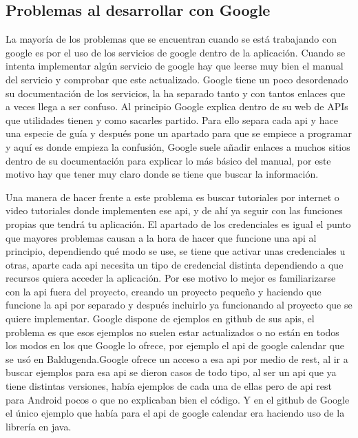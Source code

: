 \subsection{Problemas al desarrollar con Google}
\label{subsecc:Problemas al desarrollar con Google}

La mayoría de los problemas que se encuentran cuando se está trabajando con google es por el uso de los servicios de google dentro de la aplicación.
Cuando se intenta implementar algún servicio de google hay que leerse muy bien el manual del servicio y comprobar que este actualizado. Google tiene un poco desordenado su documentación de los servicios, la ha separado tanto y con tantos enlaces que a veces llega a ser confuso.
Al principio Google explica dentro de su web de APIs que utilidades tienen y como sacarles partido. Para ello separa cada api y hace una especie de guía y después pone un apartado para que se empiece a programar y aquí es donde empieza la confusión, Google suele añadir enlaces a muchos sitios dentro de su documentación para explicar lo más básico del manual, por este motivo hay que tener muy claro donde se tiene que buscar la información.

Una manera de hacer frente a este problema es buscar tutoriales por internet o video tutoriales donde implementen ese api, y de ahí ya seguir con las funciones propias que tendrá tu aplicación.
El apartado de los credenciales es igual el punto que mayores problemas causan a la hora de hacer que funcione una api al principio, dependiendo qué modo se use, se tiene que activar unas credenciales u otras, aparte cada api necesita un tipo de credencial distinta dependiendo a que recursos quiera acceder la aplicación.
Por ese motivo lo mejor es familiarizarse con la api fuera del proyecto, creando un proyecto pequeño y haciendo que funcione la api por separado y después incluirlo ya funcionando al proyecto que se quiere implementar.
Google dispone de ejemplos en github de sus apis, el problema es que esos ejemplos no suelen estar actualizados o no están en todos los modos en los que Google lo ofrece, por ejemplo el api de google calendar que se usó en Baldugenda.Google ofrece un acceso a esa api por medio de rest, al ir a buscar ejemplos para esa api se dieron casos de todo tipo, al ser un api que ya tiene distintas versiones, había ejemplos de cada una de ellas pero  de api rest para Android pocos o que no explicaban bien el código. Y en el github de Google el único ejemplo que había para el api de google calendar era haciendo uso de la librería en java.


